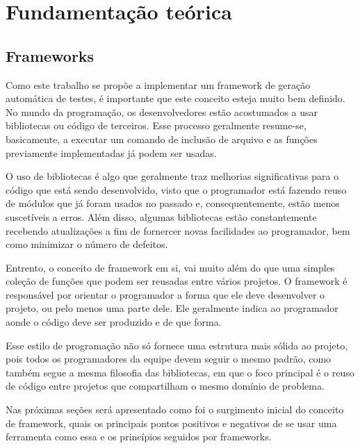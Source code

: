 \documentclass[
    12pt,       %
    openright,      %
    twoside,      %
    a4paper,      %
    english,      %
    french,       %
    spanish,      %
    brazil,       %
    ]{abntex2}
\begin{document}
  

  \part{Fundamentação teórica}

  \chapter{Frameworks}

      Como este trabalho se propõe a implementar um framework de geração
      automática de testes, é importante que este conceito esteja muito bem
      definido. No mundo da programação, os desenvolvedores estão
      acostumados a usar bibliotecas ou código de terceiros. Esse processo
      geralmente resume-se, basicamente, a executar um comando de inclusão
      de arquivo e as funções previamente implementadas já podem ser usadas.

      O uso de bibliotecas é algo que geralmente traz melhorias significativas
      para o código que está sendo desenvolvido, visto que o programador
      está fazendo reuso de módulos que já foram usados no passado e,
      consequentemente, estão menos suscetíveis a erros. Além
      disso, algumas bibliotecas estão constantemente recebendo atualizações
      a fim de fornercer novas facilidades ao programador, bem como minimizar
      o número de defeitos.

      Entrento, o conceito de framework em si, vai muito além do que uma
      simples coleção de funções que podem ser reusadas entre vários
      projetos. O framework é responsável por orientar o programador
      a forma que ele deve desenvolver o projeto, ou pelo menos uma parte dele.
      Ele geralmente indica ao programador aonde o código deve ser
      produzido e de que forma.

      Esse estilo de programação não só fornece uma estrutura mais sólida
      ao projeto, pois todos os programadores da equipe devem seguir o mesmo
      padrão, como também segue a mesma filosofia das bibliotecas, em que o
      foco principal é o reuso de código entre projetos que compartilham
      o mesmo domínio de problema.

      Nas próximas seções será apresentado como foi o surgimento inicial
      do conceito de framework, quais os principais pontos positivos e
      negativos de se usar uma ferramenta como essa e os princípios
      seguidos por frameworks.
\end{document}
